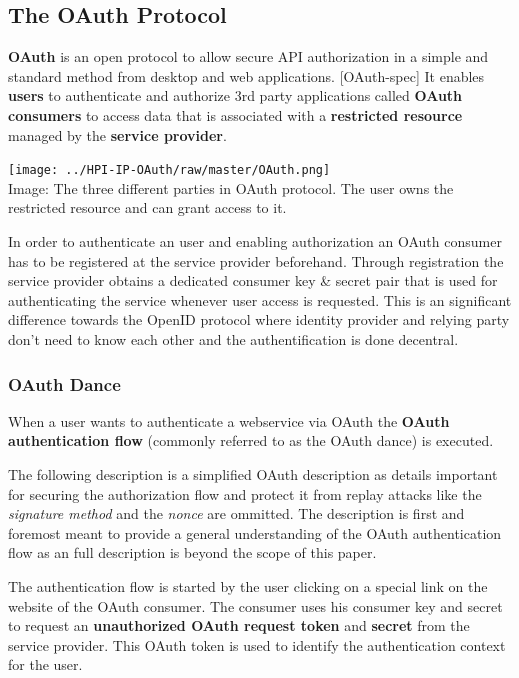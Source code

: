 \subsection{The OAuth Protocol}

\textbf{OAuth} is an open protocol to allow secure API
authorization in a simple and standard method from desktop and web
applications. [OAuth-spec] It enables \textbf{users} to
authenticate and authorize 3rd party applications called
\textbf{OAuth consumers} to access data that is associated with a
\textbf{restricted resource} managed by the
\textbf{service provider}.

\texttt{[image: ../HPI-IP-OAuth/raw/master/OAuth.png]}\\Image: The
three different parties in OAuth protocol. The user owns the
restricted resource and can grant access to it.

In order to authenticate an user and enabling authorization an
OAuth consumer has to be registered at the service provider
beforehand. Through registration the service provider obtains a
dedicated consumer key \& secret pair that is used for
authenticating the service whenever user access is requested. This
is an significant difference towards the OpenID protocol where
identity provider and relying party don't need to know each other
and the authentification is done decentral.

\subsubsection{OAuth Dance}

When a user wants to authenticate a webservice via OAuth the
\textbf{OAuth authentication flow} (commonly referred to as the
OAuth dance) is executed.

The following description is a simplified OAuth description as
details important for securing the authorization flow and protect
it from replay attacks like the \emph{signature method} and the
\emph{nonce} are ommitted. The description is first and foremost
meant to provide a general understanding of the OAuth
authentication flow as an full description is beyond the scope of
this paper.

The authentication flow is started by the user clicking on a
special link on the website of the OAuth consumer. The consumer
uses his consumer key and secret to request an
\textbf{unauthorized OAuth request token} and \textbf{secret} from
the service provider. This OAuth token is used to identify the
authentication context for the user.

